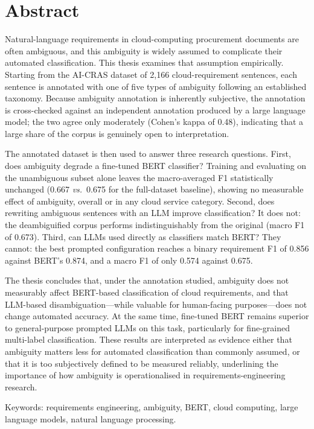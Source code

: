 \thispagestyle{plain}
\setlength{\parskip}{0pt plus 1.0pt}
\section*{Abstract}

Natural-language requirements in cloud-computing procurement documents are often ambiguous, and this ambiguity is widely assumed to complicate their automated classification. This thesis examines that assumption empirically. Starting from the AI-CRAS dataset of 2,166 cloud-requirement sentences, each sentence is annotated with one of five types of ambiguity following an established taxonomy. Because ambiguity annotation is inherently subjective, the annotation is cross-checked against an independent annotation produced by a large language model; the two agree only moderately (Cohen's kappa of 0.48), indicating that a large share of the corpus is genuinely open to interpretation.

The annotated dataset is then used to answer three research questions. First, does ambiguity degrade a fine-tuned BERT classifier? Training and evaluating on the unambiguous subset alone leaves the macro-averaged F1 statistically unchanged (0.667 \textit{vs.}~0.675 for the full-dataset baseline), showing no measurable effect of ambiguity, overall or in any cloud service category. Second, does rewriting ambiguous sentences with an LLM improve classification? It does not: the deambiguified corpus performs indistinguishably from the original (macro F1 of 0.673). Third, can LLMs used directly as classifiers match BERT? They cannot: the best prompted configuration reaches a binary requirement F1 of 0.856 against BERT's 0.874, and a macro F1 of only 0.574 against 0.675.

The thesis concludes that, under the annotation studied, ambiguity does not measurably affect BERT-based classification of cloud requirements, and that LLM-based disambiguation---while valuable for human-facing purposes---does not change automated accuracy. At the same time, fine-tuned BERT remains superior to general-purpose prompted LLMs on this task, particularly for fine-grained multi-label classification. These results are interpreted as evidence either that ambiguity matters less for automated classification than commonly assumed, or that it is too subjectively defined to be measured reliably, underlining the importance of how ambiguity is operationalised in requirements-engineering research.

\vfill
Keywords: requirements engineering, ambiguity, BERT, cloud computing, large language models, natural language processing.

\thispagestyle{empty}
\mbox{}
